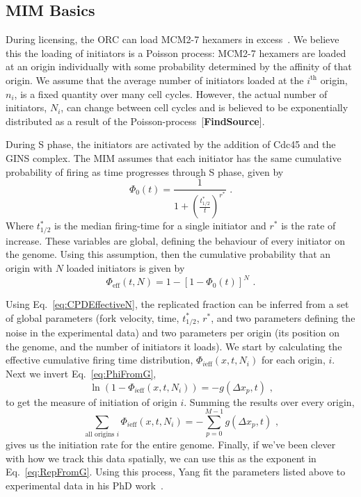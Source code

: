 {		\subsection{MIM Basics}
		\label{subsec:MIMBasics}
		During licensing, the ORC can load MCM2-7 hexamers in excess~\cite{MultiMCM}.
		We believe this the loading of initiators is a Poisson process:
		MCM2-7 hexamers are loaded at an origin individually with some probability determined by the affinity of that origin.
		We assume that the average number of initiators loaded at the $i^{\text{th}}$ origin, $n_i$, is a fixed quantity over many cell cycles.
		However, the actual number of initiators, $N_i$, can change between cell cycles and is believed to be exponentially distributed as a result of the Poisson-process~[\textbf{FindSource}].
		
		During S phase, the initiators are activated by the addition of Cdc45 and the GINS complex.
		The MIM assumes that each initiator has the same cumulative probability of firing as time progresses through S phase, given by
		\begin{equation}\label{eq:CPDInitiator}
			\Phi_0(t) = \frac{1}{1+\left(\frac{t^*_{1/2}}{t}\right)^{r^*}}\text{ .}
		\end{equation}
		Where $t^*_{1/2}$ is the median firing-time for a single initiator and $r^*$ is the rate of increase.
		These variables are global, defining the behaviour of every initiator on the genome.
		Using this assumption, then the cumulative probability that an origin with $N$ loaded initiators is given by
		\begin{equation} \label{eq:CPDEffectiveN}
			\Phi_{\text{eff}}(t,N) = 1 - \left[1 - \Phi_0(t)\right]^N\text{ .}
		\end{equation}
		
		Using Eq.~\ref{eq:CPDEffectiveN}, the replicated fraction can be inferred from a set of global parameters (fork velocity, time, $t^*_{1/2}$, $r^*$, and two parameters defining the noise in the experimental data) and two parameters per origin (its position on the genome, and the number of initiators it loads).
		We start by calculating the effective cumulative firing time distribution, $\Phi_{i\text{eff}}(x,t,N_i)$ for each origin, $i$.
		Next we invert Eq.~\ref{eq:PhiFromG},
		\begin{equation}
			\ln \left( 1- \Phi_{i\text{eff}}(x,t,N_i)\right) = - g(\Delta x_p, t) \text{ ,}
		\end{equation}
		to get the measure of initiation of origin $i$.
		Summing the results over every origin,
		\begin{equation}
			\sum\limits_{\text{all origins }i}\Phi_{i\text{eff}}(x,t,N_i) = - \sum\limits_{p=0}^{M-1} g(\Delta x_p,t) \text{ ,}
		\end{equation}
		gives us the initiation rate for the entire genome.
		Finally, if we've been clever with how we track this data spatially, we can use this as the exponent in Eq.~\ref{eq:RepFromG}.
		Using this process, Yang fit the parameters listed above to experimental data in his PhD work~\cite{ScottsThesis}.
	
}
